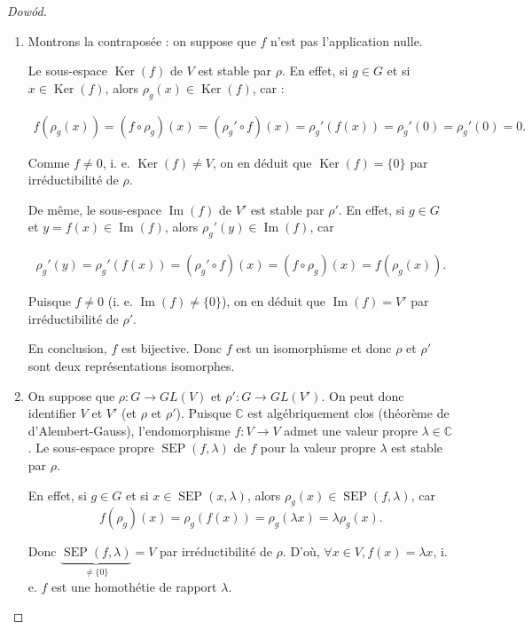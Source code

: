 \documentclass[french]{book}
\theoremstyle{definition}
\theoremstyle{remark}
\begin{document}
\begin{proof}[Dow\'od]

  \

  \begin{enumerate}
    \item Montrons la contraposée : on suppose que \(f\) n'est pas l'application nulle.

    Le sous-espace \(\operatorname{Ker}(f)\) de \(V\) est stable par \(\rho\). En effet, si \(g \in G\) et si \(x \in \operatorname{Ker}(f)\), alors \(\rho_g(x) \in \operatorname{Ker}(f)\), car :

    \begin{gather*}
      f(\rho_g(x)) = (f \circ \rho_g)(x) = (\rho_g' \circ f)(x) = \rho_g'(f(x)) = \rho_g'(0) = \rho_g'(0)=0.
    \end{gather*}

    Comme \(f \neq 0\), i. e. \(\operatorname{Ker}(f) \neq V\), on en déduit que \(\operatorname{Ker}(f) = \{ 0 \}\) par irréductibilité de \(\rho\).

    De même, le sous-espace \(\operatorname{Im}(f)\) de \(V'\) est stable par \(\rho'\). En effet, si \(g \in G\) et \(y=f(x) \in \operatorname{Im}(f)\), alors \(\rho_g'(y) \in \operatorname{Im}(f)\), car

    \begin{gather*}
      \rho_g'(y) = \rho_g'(f(x)) = (\rho_g' \circ f)(x) = (f \circ \rho_g)(x) = f(\rho_g(x)).
    \end{gather*}

    Puisque \(f \neq 0\) (i. e. \(\operatorname{Im}(f) \neq \{ 0 \} \)), on en déduit que \(\operatorname{Im}(f) = V'\) par irréductibilité de \(\rho'\).

    En conclusion, \(f\) est bijective. Donc \(f\) est un isomorphisme et donc \(\rho\) et \(\rho'\) sont deux représentations isomorphes.

    \item On suppose que \(\rho : G \longrightarrow GL(V)\) et \(\rho' : G \longrightarrow GL(V')\). On peut donc identifier \(V\) et \(V'\) (et \(\rho \text{ et } \rho'\)). Puisque \(\mathbb{C}\) est algébriquement clos (théorème de d'Alembert-Gauss), l'endomorphisme \(f : V \longrightarrow V \) admet une valeur propre \(\lambda \in \mathbb{C}\). Le sous-espace propre \(\operatorname{SEP}(f, \lambda)\) de \(f\) pour la valeur propre \(\lambda\) est stable par \(\rho\).

    En effet, si \(g \in G\) et si \(x \in \operatorname{SEP}(x, \lambda)\), alors \(\rho_g(x) \in \operatorname{SEP}(f, \lambda)\), car \[f(\rho_g)(x) = \rho_g(f(x)) = \rho_g(\lambda x) = \lambda \rho_g(x).\]

    Donc \( \underbrace{\operatorname{SEP}(f, \lambda)}_{\neq \{ 0 \}} = V\) par irréductibilité de \(\rho\). D'où, \( \forall x \in V, f(x) = \lambda x\), i. e. \(f\) est une homothétie de rapport \(\lambda\).
  \end{enumerate}
\end{proof}
\end{document}
